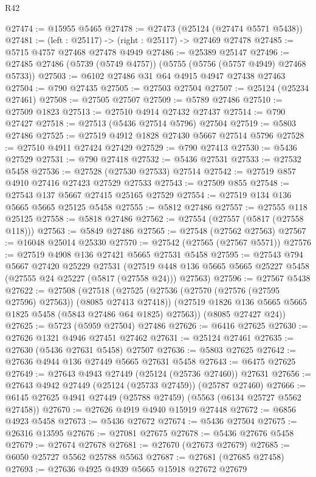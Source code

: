 \begin{lexlean}{R42}
\begin{coremodule}
@27474 := @15955 @5465
@27478 := @27473 (@25124 (@27474 @5571 @5438))
@27481 := (left : @25117) -> (right : @25117) -> @27469 @27478
@27485 := @5715 @4757 @27468 @27478 @4949
@27486 := @25389 @25147
@27496 := @27485 @27486 (@5739 (@5749 @4757)) (@5755 (@5756 (@5757 @4949) @27468 @5733))
@27503 := @6102 @27486 @31 @64 @4915 @4947 @27438 @27463
@27504 := @790 @27435
@27505 := @27503 @27504
@27507 := @25124 (@25234 @27461)
@27508 := @27505 @27507
@27509 := @5789 @27486
@27510 := @27509 @1823
@27513 := @27510 @4914 @27432 @27437
@27514 := @790 @27427
@27518 := @27513 (@5436 @27514 @5796) @27504
@27519 := @5803 @27486
@27525 := @27519 @4912 @1828 @27430 @5667 @27514 @5796
@27528 := @27510 @4911 @27424 @27429
@27529 := @790 @27413
@27530 := @5436 @27529
@27531 := @790 @27418
@27532 := @5436 @27531
@27533 := @27532 @5458
@27536 := @27528 (@27530 @27533) @27514
@27542 := @27519 @857 @4910 @27416 @27423 @27529 @27533
@27543 := @27509 @855
@27548 := @27543 @137 @5667 @27415 @25165 @27529
@27554 := @27519 @134 @136 @5665 @5665 @25125 @5458
@27555 := @5812 @27486
@27557 := @27555 @118 @25125
@27558 := @5818 @27486
@27562 := @27554 (@27557 (@5817 (@27558 @118)))
@27563 := @5849 @27486
@27565 := @27548 (@27562 @27563)
@27567 := @16048 @25014 @25330
@27570 := @27542 (@27565 (@27567 @5571))
@27576 := @27519 @4908 @136 @27421 @5665 @27531 @5458
@27595 := @27543
    @794
    @5667
    @27420
    @25229
    @27531
    (@27519 @448 @136 @5665 @5665 @25227 @5458 (@27555 @24 @25227 (@5817 (@27558 @24))) @27563)
@27596 := @27567 @5438
@27622 := @27508
    (@27518
      (@27525
        (@27536 (@27570 (@27576 (@27595 @27596) @27563)) (@8085 @27413 @27418))
        (@27519 @1826 @136 @5665 @5665 @1825 @5458 (@5843 @27486 @64 @1825) @27563))
      (@8085 @27427 @24))
@27625 := @5723 (@5959 @27504) @27486
@27626 := @6416 @27625
@27630 := @27626 @1321 @4946 @27451 @27462
@27631 := @25124 @27461
@27635 := @27630 (@5436 @27631 @5458) @27507
@27636 := @5803 @27625
@27642 := @27636 @4944 @136 @27449 @5665 @27631 @5458
@27643 := @6475 @27625
@27649 := @27643 @4943 @27449 (@25124 (@25736 @27460)) @27631
@27656 := @27643 @4942 @27449 (@25124 (@25733 @27459)) (@25787 @27460)
@27666 := @6145 @27625 @4941 @27449 (@25788 @27459) (@5563 (@6134 @25727 @5562 @27458))
@27670 := @27626 @4919 @4940 @15919 @27448
@27672 := @6856 @4923 @5458
@27673 := @5436 @27672
@27674 := @5436 @27504
@27675 := @26316 @13595
@27676 := @27081 @27675
@27678 := @5436 @27676 @5458
@27679 := @27674 @27678
@27681 := @27670 (@27673 @27679)
@27685 := @6050 @25727 @5562 @25788 @5563
@27687 := @27681 (@27685 @27458)
@27693 := @27636 @4925 @4939 @5665 @15918 @27672 @27679

\end{coremodule}
\end{lexlean}
